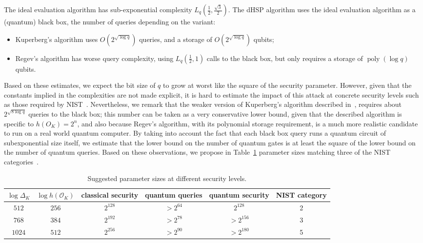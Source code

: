 \documentclass{article}
\renewcommand{\O}{\mathcal{O}}
\theoremstyle{definition}
\DeclareMathOperator{\poly}{poly}
\begin{document}
The ideal evaluation algorithm has sub-exponential complexity
$L_q(\frac{1}{2},\frac{\sqrt{3}}{2})$.  The dHSP algorithm uses the
ideal evaluation algorithm as a (quantum) black box, the number of
queries depending on the variant:
\begin{itemize}
\item Kuperberg's algorithm uses $O(2^{\sqrt{\log q}})$ queries, and a
  storage of $O(2^{\sqrt{\log q}})$ qubits;
\item Regev's algorithm has worse query complexity, using
  $L_q(\frac{1}{2},1)$ calls to the black box, but only requires a
  storage of $\poly(\log q)$ qubits.
\end{itemize}

Based on these estimates, we expect the bit size of $q$ to grow at
worst like the square of the security parameter. However, given that
the constants implied in the complexities are not made explicit, it is
hard to estimate the impact of this attack at concrete security levels
such as those required by NIST~\cite{NIST2016}. Nevertheless, we
remark that the weaker version of Kuperberg's algorithm described
in~\cite[§2.1]{regev04}, requires about $2^{\sqrt{8\log q}}$ queries
to the black box; this number can be taken as a very conservative
lower bound, given that the described algorithm is specific to
$h(O_K)=2^n$, and also because Regev's algorithm, with its polynomial
storage requirement, is a much more realistic candidate to run on a
real world quantum computer. By taking into account the fact that each
black box query runs a quantum circuit of subexponential size itself,
we estimate that the lower bound on the number of quantum gates is at
least the square of the lower bound on the number of quantum
queries. Based on these observations, we propose in
Table~\ref{tab:sizes} parameter sizes matching three of the NIST
categories~\cite{NIST2016}.

\begin{table}
  \renewcommand{\arraystretch}{1.4}
  \centering
  \begin{tabular}{c | c | c | c | c | c}
    $\log Δ_K$ & $\log h(\O_K)$
    & \parbox{10ex}{\centering classical security}
    & \parbox{10ex}{\centering quantum queries}
    & \parbox{10ex}{\centering quantum security}
    & \parbox{10ex}{\centering NIST category}\\
    \hline
    $512$  & $256$ & $2^{128}$ & $> 2^{64}$ & $2^{128}$ & 2\\
    $768$  & $384$ & $2^{192}$ & $> 2^{78}$ & $> 2^{156}$ & 3\\
    $1024$ & $512$ & $2^{256}$ & $> 2^{90}$ & $> 2^{180}$ & 5
  \end{tabular}
  \caption{Suggested parameter sizes at different security levels.}
  \label{tab:sizes}
\end{table}
\end{document}

